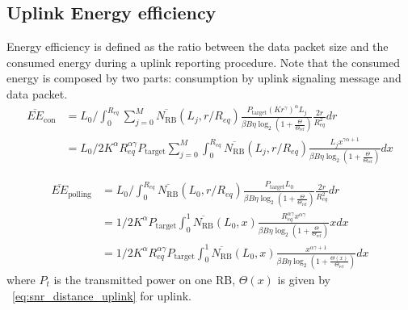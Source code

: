 \subsection{Uplink Energy efficiency}
Energy efficiency is defined as the ratio between the data packet size and the consumed energy during a uplink reporting procedure. Note that the consumed energy is composed by two parts: consumption by uplink signaling message and data packet.
\begin{align}
	\overline{EE}_{\text{con}} &= L_0/\int_{0}^{R_{eq}} \sum_{j=0}^{M}\overline{N_{\text{RB}}}(L_j, r/R_{eq}) \frac{P_{\text{target}} (Kr^{\gamma})^{\alpha} L_j}{\beta B \eta  \log_2 \left( 1 + \frac{\Theta}{\Theta_{\text{ref}}} \right)} \frac{2r}{R_{eq}^2}dr \nonumber\\
	&= L_0/2 K^{\alpha} R_{eq}^{\alpha\gamma} P_{\text{target}} \sum_{j=0}^{M} \int_{0}^{R_{eq}} \overline{N_{\text{RB}}}(L_j, r/R_{eq}) \frac{ L_j x^{\gamma\alpha + 1} }{\beta B \eta  \log_2 \left( 1 + \frac{\Theta}{\Theta_{\text{ref}}} \right)} dx
\end{align}

\begin{align}
	\overline{EE}_{\text{polling}} &= L_0 / \int_{0}^{R_{eq}} \overline{N_{\text{RB}}}\left( L_0, r/R_{eq}\right) \frac{ P_{\text{target}} L_0}{\beta B \eta  \log_2 \left( 1 + \frac{\Theta}{\Theta_{\text{ref}}} \right)} \frac{2r}{R_{eq}^2}dr \nonumber\\
	&= 1 / 2 K^{\alpha} P_{\text{target}} \int_{0}^{1} \overline{N_{\text{RB}}}\left( L_0, x \right) \frac{ R_{eq}^{\alpha \gamma} x^{\alpha \gamma} }{\beta B \eta  \log_2 \left( 1 + \frac{\Theta}{\Theta_{\text{ref}}} \right)} x d x \nonumber \\
	&= 1/ 2 K^{\alpha} R_{eq}^{\alpha \gamma} P_{\text{target}} \int_{0}^{1} \overline{N_{\text{RB}}}\left( L_0, x \right) \frac{  x^{\alpha \gamma + 1} }{\beta B \eta  \log_2 \left( 1 + \frac{\Theta(x)}{\Theta_{\text{ref}}} \right)} d x
\end{align}
where $P_t$ is the transmitted power on one RB, $\Theta(x)$ is given by ~\eqref{eq:snr_distance_uplink} for uplink.

